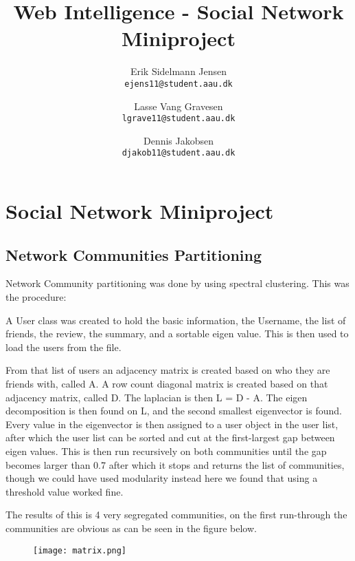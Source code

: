 

\author{
  Erik Sidelmann Jensen\\
  \texttt{ejens11@student.aau.dk}
  \and
  Lasse Vang Gravesen\\
  \texttt{lgrave11@student.aau.dk}
  \and
  Dennis Jakobsen\\
  \texttt{djakob11@student.aau.dk}  
}

\title{Web Intelligence - Social Network Miniproject}
\date{}


	\clearpage\maketitle
	\thispagestyle{empty}
	
	\chapter{Social Network Miniproject}
	\section{Network Communities Partitioning}
	Network Community partitioning was done by using spectral clustering. This was the procedure:
	
	A User class was created to hold the basic information, the Username, the list of friends, the review, the summary, and a sortable eigen value. This is then used to load the users from the file.
	
	From that list of users an adjacency matrix is created based on who they are friends with, called A. A row count diagonal matrix is created based on that adjacency matrix, called D. The laplacian is then L = D - A. The eigen decomposition is then found on L, and the second smallest eigenvector is found. Every value in the eigenvector is then assigned to a user object in the user list, after which the user list can be sorted and cut at the first-largest gap between eigen values. This is then run recursively on both communities until the gap becomes larger than 0.7 after which it stops and returns the list of communities, though we could have used modularity instead here we found that using a threshold value worked fine.
	
	The results of this is 4 very segregated communities, on the first run-through the communities are obvious as can be seen in the figure below.
	
	\begin{figure}[H]
	\texttt{[image: matrix.png]}
	\end{figure}
	
